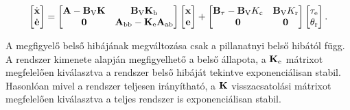 \begin{align}
    \begin{bmatrix}
        \dot{\mathbf{x}} \\
        \dot{\mathbf{e}}
    \end{bmatrix}
    =
    \begin{bmatrix}
        \mathbf{A} - \mathbf{B}_{\mathrm{V}} \mathbf{K} & \mathbf{B}_{\mathrm{V}} \mathbf{K}_{\mathrm{b}} \\
        \mathbf{0} & \mathbf{A}_{\mathrm{bb}} - \mathbf{K}_{\mathrm{e}} \mathbf{A}_{\mathrm{ab}}
    \end{bmatrix}
    \begin{bmatrix}
        \mathbf{x} \\
        \mathbf{e}
    \end{bmatrix}
    +
    \begin{bmatrix}
        \mathbf{B}_{\mathrm{\tau}} - \mathbf{B}_{\mathrm{V}} K_{\mathrm{c}} & \mathbf{B}_{\mathrm{V}} K_{\mathrm{r}}\\
        \mathbf{0} & \mathbf{0}
    \end{bmatrix}
    \begin{bmatrix}
        \tau_{\mathrm{e}} \\
        \theta_{\mathrm{r}}
    \end{bmatrix}.
\end{align}

A megfigyelő belső hibájának megváltozása csak a pillanatnyi belső hibától függ. A rendszer 
kimenete alapján megfigyelhető a belső állapota, a \(\mathbf{K}_{\mathrm{e}}\) mátrixot megfelelően kiválasztva
a rendszer belső hibáját tekintve exponenciálisan stabil. Hasonlóan mivel a rendszer teljesen irányítható,
a \(\mathbf{K}\) visszacsatolási mátrixot megfelelően kiválasztva a teljes rendszer is exponenciálisan stabil.

